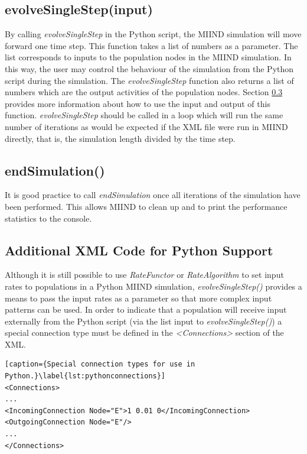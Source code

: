 \documentclass[utf8]{frontiersSCNS} %
\begin{document}
\subsection{evolveSingleStep(input)}
By calling \textit{evolveSingleStep} in the Python script, the MIIND simulation will move forward one time step. This function takes a list of numbers as a parameter. The list corresponds to inputs to the population nodes in the MIIND simulation. In this way, the user may control the behaviour of the simulation from the Python script during the simulation. The \textit{evolveSingleStep} function also returns a list of numbers which are the output activities of the population nodes. Section \ref{externalconnections} provides more information about how to use the input and output of this function. \textit{evolveSingleStep} should be called in a loop which will run the same number of iterations as would be expected if the XML file were run in MIIND directly, that is, the simulation length divided by the time step.\\

\subsection{endSimulation()}
It is good practice to call \textit{endSimulation} once all iterations of the simulation have been performed. This allows MIIND to clean up and to print the performance statistics to the console.\\

\subsection{Additional XML Code for Python Support}
\label{externalconnections}
Although it is still possible to use \textit{RateFunctor} or \textit{RateAlgorithm} to set input rates to populations in a Python MIIND simulation, \textit{evolveSingleStep()} provides a means to pass the input rates as a parameter so that more complex input patterns can be used. In order to indicate that a population will receive input externally from the Python script (via the list input to \textit{evolveSingleStep()}) a special connection type must be defined in the \textit{\textless Connections\textgreater} section of the XML.

\begin{lstlisting}[caption={Special connection types for use in Python.}\label{lst:pythonconnections}]
<Connections>
...
<IncomingConnection Node="E">1 0.01 0</IncomingConnection>
<OutgoingConnection Node="E"/>
...
</Connections>
\end{lstlisting}
\end{document}
